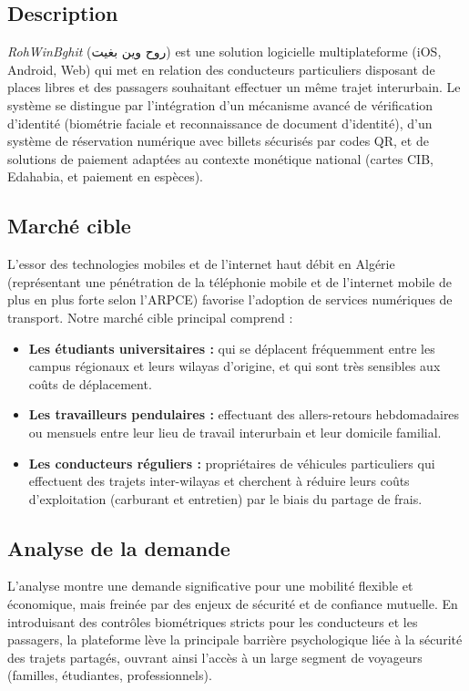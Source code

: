 \documentclass[11pt,a4paper]{article}
\begin{document}
\subsection{Description}
\textit{RohWinBghit} (روح وين بغيت) est une solution logicielle multiplateforme (iOS, Android, Web) qui met en relation des conducteurs particuliers disposant de places libres et des passagers souhaitant effectuer un même trajet interurbain. Le système se distingue par l'intégration d'un mécanisme avancé de vérification d'identité (biométrie faciale et reconnaissance de document d'identité), d'un système de réservation numérique avec billets sécurisés par codes QR, et de solutions de paiement adaptées au contexte monétique national (cartes CIB, Edahabia, et paiement en espèces). 

\subsection{Marché cible}
L'essor des technologies mobiles et de l'internet haut débit en Algérie (représentant une pénétration de la téléphonie mobile et de l'internet mobile de plus en plus forte selon l'ARPCE) favorise l'adoption de services numériques de transport. Notre marché cible principal comprend :
\begin{itemize}[leftmargin=1.5em]
  \item \textbf{Les étudiants universitaires :} qui se déplacent fréquemment entre les campus régionaux et leurs wilayas d'origine, et qui sont très sensibles aux coûts de déplacement.
  \item \textbf{Les travailleurs pendulaires :} effectuant des allers-retours hebdomadaires ou mensuels entre leur lieu de travail interurbain et leur domicile familial.
  \item \textbf{Les conducteurs réguliers :} propriétaires de véhicules particuliers qui effectuent des trajets inter-wilayas et cherchent à réduire leurs coûts d'exploitation (carburant et entretien) par le biais du partage de frais.
\end{itemize}

\subsection{Analyse de la demande}
L'analyse montre une demande significative pour une mobilité flexible et économique, mais freinée par des enjeux de sécurité et de confiance mutuelle. En introduisant des contrôles biométriques stricts pour les conducteurs et les passagers, la plateforme lève la principale barrière psychologique liée à la sécurité des trajets partagés, ouvrant ainsi l'accès à un large segment de voyageurs (familles, étudiantes, professionnels).
\end{document}
